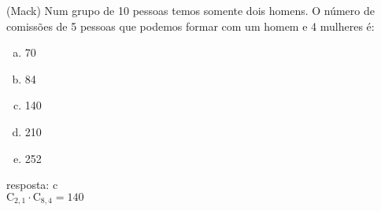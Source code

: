 \begin{ex}
 (Mack) Num grupo de 10 pessoas temos somente dois homens. O número de comissões de 5 pessoas que podemos formar com um homem e 4 mulheres é:
    \begin{enumerate}[(a)]
    \item 70
    \item 84
    \item 140
    \item 210
    \item 252
    \end{enumerate}
      \begin{sol}
       resposta: c \\
       $\mathrm{C}_{2,1}\cdot\mathrm{C}_{8,4}=140$
      \end{sol}
\end{ex}